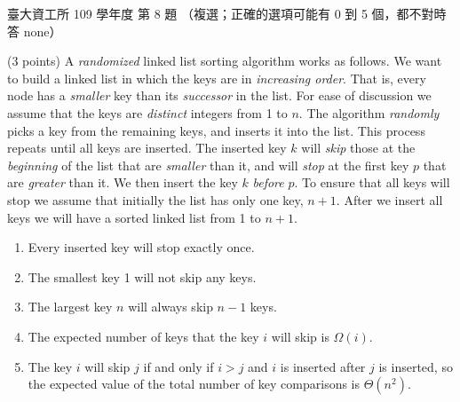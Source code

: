 \begin{pastexam}[label={px:ntu-109-dsaa-08}]{臺大資工所 109 學年度 第 8 題}
（複選；正確的選項可能有 0 到 5 個，都不對時答 none）

(3 points) A \textit{randomized} linked list sorting algorithm works as follows. We want to build
a linked list in which the keys are in \textit{increasing order}. That is, every node has a
\textit{smaller} key than its \textit{successor} in the list. For ease of discussion we assume
that the keys are \textit{distinct} integers from 1 to $n$. The algorithm \textit{randomly} picks
a key from the remaining keys, and inserts it into the list. This process repeats until all keys
are inserted. The inserted key $k$ will \textit{skip} those at the \textit{beginning} of the list
that are \textit{smaller} than it, and will \textit{stop} at the first key $p$ that are
\textit{greater} than it. We then insert the key $k$ \textit{before} $p$. To ensure that all keys
will stop we assume that initially the list has only one key, $n+1$. After we insert all keys we
will have a sorted linked list from 1 to $n+1$.
\begin{enumerate}[label=\arabic*.]
\item Every inserted key will stop exactly once.
\item The smallest key 1 will not skip any keys.
\item The largest key $n$ will always skip $n-1$ keys.
\item The expected number of keys that the key $i$ will skip is $\Omega(i)$.
\item The key $i$ will skip $j$ if and only if $i>j$ and $i$ is inserted after $j$ is inserted,
so the expected value of the total number of key comparisons is $\Theta(n^2)$.
\end{enumerate}
\end{pastexam}

